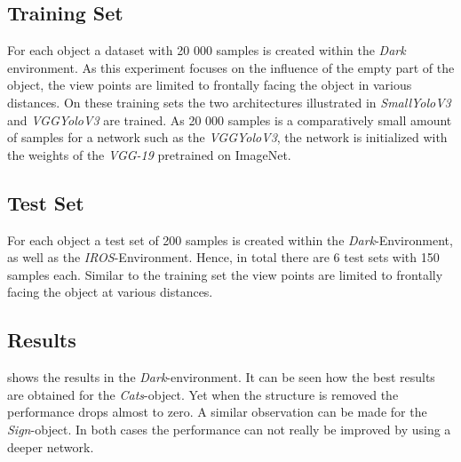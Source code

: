 \subsection{Training Set}

For each object a dataset with 20 000 samples is created within the \textit{Dark} environment. As this experiment focuses on the influence of the empty part of the object, the view points are limited to frontally facing the object in various distances. On these training sets the two architectures illustrated in  \textit{SmallYoloV3} and \textit{VGGYoloV3} are trained. As 20 000 samples is a comparatively small amount of samples for a network such as the \textit{VGGYoloV3}, the network is initialized with the weights of the \textit{VGG-19} pretrained on ImageNet.


\subsection{Test Set}

For each object a test set of 200 samples is created within the \textit{Dark}-Environment, as well as the \textit{IROS}-Environment. Hence, in total there are 6 test sets with 150 samples each. Similar to the training set the view points are limited to frontally facing the object at various distances.



\subsection{Results}

\begin{table}
	\centering
	
	\caption{Performance of two architectures when the test environment is similar to the training environment. Each trained network (row) is evaluated on each test set (column). It can be seen how the detectors exploit the structure that is placed in the object. In contrary, the detector of \acp{EWFO} only gets confused when the structure inside the object is very different from the training set.}
	\label{tab:all_basement}
\end{table}

 shows the results in the \textit{Dark}-environment. It can be seen how the best results are obtained for the \textit{Cats}-object. Yet when the structure is removed the performance drops almost to zero. A similar observation can be made for the \textit{Sign}-object. In both cases the performance can not really be improved by using a deeper network.

